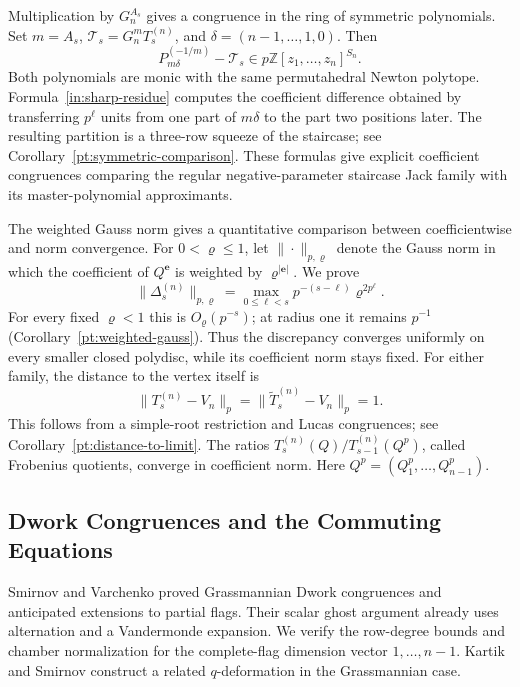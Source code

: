 \documentclass[11pt]{amsart}
\theoremstyle{definition}
\theoremstyle{remark}
\numberwithin{equation}{section}
\newcommand{\Z}{\mathbb Z}
\begin{document}
Multiplication by $G_n^{A_s}$ gives a congruence in the ring of
symmetric polynomials. Set $m=A_s$,
$\mathcal T_s=G_n^mT_s^{(n)}$, and $\delta=(n-1,\ldots,1,0)$.
Then
\[
 P_{m\delta}^{(-1/m)}-\mathcal T_s
 \in p\Z[z_1,\ldots,z_n]^{S_n}.
\]
Both polynomials are monic with the same permutahedral Newton
polytope. Formula~\eqref{in:sharp-residue} computes the
coefficient difference obtained by transferring $p^\ell$ units
from one part of $m\delta$ to the part two positions later.
The resulting partition is a three-row squeeze of the staircase;
see Corollary~\ref{pt:symmetric-comparison}. These formulas give
explicit coefficient congruences comparing the regular
negative-parameter staircase Jack family with its
master-polynomial approximants.

The weighted Gauss norm gives a quantitative comparison between
coefficientwise and norm convergence. For $0<\varrho\leq1$,
let $\|\cdot\|_{p,\varrho}$ denote the Gauss norm in which the
coefficient of $Q^{\boldsymbol e}$ is weighted by
$\varrho^{|\boldsymbol e|}$. We prove
\[
 \|\Delta_s^{(n)}\|_{p,\varrho}
 =\max_{0\leq\ell<s}p^{-(s-\ell)}\varrho^{2p^\ell}.
\]
For every fixed $\varrho<1$ this is $O_\varrho(p^{-s})$;
at radius one it remains $p^{-1}$
(Corollary~\ref{pt:weighted-gauss}). Thus the discrepancy
converges uniformly on every smaller closed polydisc, while
its coefficient norm stays fixed. For either family, the
distance to the vertex itself is
\begin{equation}\label{in:distance-to-vertex}
 \|T_s^{(n)}-V_n\|_p
 =\|\widetilde T_s^{(n)}-V_n\|_p=1.
\end{equation}
This follows from a simple-root restriction and Lucas
congruences; see Corollary~\ref{pt:distance-to-limit}.
The ratios $T_s^{(n)}(Q)/T_{s-1}^{(n)}(Q^p)$, called
Frobenius quotients, converge in coefficient norm.
Here $Q^p=(Q_1^p,\ldots,Q_{n-1}^p)$.

\subsection{Dwork Congruences and the Commuting Equations}
Smirnov and Varchenko \cite{SV23} proved Grassmannian Dwork
congruences and anticipated extensions to partial flags.
Their scalar ghost argument already uses alternation and a
Vandermonde expansion. We verify the row-degree bounds and
chamber normalization for the complete-flag dimension vector
$1,\ldots,n-1$. Kartik and Smirnov \cite{KaS25} construct a
related $q$-deformation in the Grassmannian case.
\end{document}
